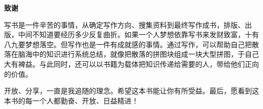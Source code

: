 \backmatter
\printindex
\newpage
\thispagestyle{empty}

\begin{center}  %
     \Large\bfseries 致谢\\[1cm]  %
\end{center}

写书是一件辛苦的事情，从确定写作方向、搜集资料到最终写作成书，排版、出版，中间不知道要经历多少反复曲折。如果一个人梦想依靠写书来发财致富，十有八九要梦想落空。但写作也是一件有成就感的事情。通过写作，可以帮助自己把散落在脑海中的知识进行系统总结，就像把散落的拼图块组成一块大型拼图，于自己大有裨益。与此同时，还可以以书籍为载体把知识传递给需要的人，带给他们正向的价值。

\par  %
开放、分享，一直是我追随的理念。希望这本书能让你有所受益。最后，愿看到这本书的每一个人都勤奋、开放、日益精进！
